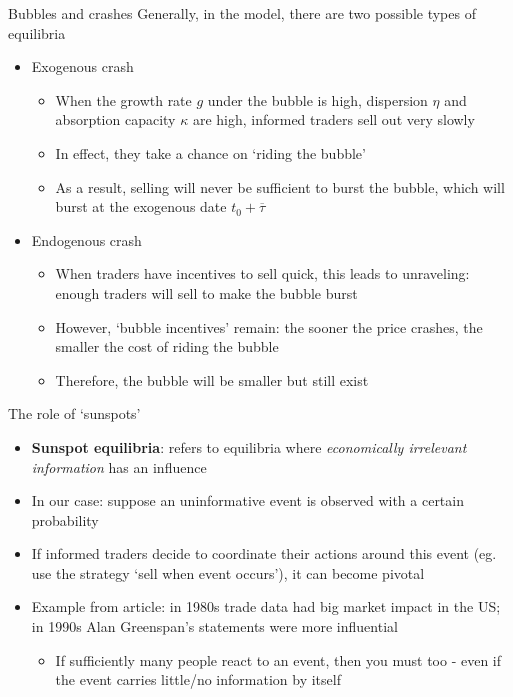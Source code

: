 \documentclass[english,10pt
,aspectratio=169
]{beamer}
\begin{document}
\begin{frame}{Bubbles and crashes}
	Generally, in the model, there are two possible types of equilibria
	\begin{itemize}
		\item Exogenous crash
		\begin{itemize}
			\item When the growth rate $g$ under the bubble is high, dispersion $\eta$ and absorption capacity $\kappa$ are high,  informed traders sell out very slowly
			\item In effect, they take a chance on `riding the bubble'
			\item As a result, selling will never be sufficient to burst the bubble, which will burst at the exogenous date $t_0+\overline{\tau}$
		\end{itemize}
		\item Endogenous crash
		\begin{itemize}
			\item When traders have incentives to sell quick, this leads to unraveling: enough traders will sell to make the bubble burst
			\item However, `bubble incentives' remain: the sooner the price crashes, the smaller the cost of riding the bubble
			\item Therefore, the bubble will be smaller but still exist
		\end{itemize}
	\end{itemize}
\end{frame}


\begin{frame}{The role of `sunspots'}
	\begin{itemize}
		\item \textbf{Sunspot equilibria}: refers to equilibria where \emph{economically irrelevant information} has an influence
		\item In our case: suppose an uninformative event is observed with a certain probability 
		\item If informed traders decide to coordinate their actions around this event (eg. use the strategy `sell when event occurs'), it can become pivotal
		\item Example from article: in 1980s trade data had big market impact in the US; in 1990s Alan Greenspan's statements were more influential
		\begin{itemize}
			\item If sufficiently many people react to an event, then you must too - even if the event carries little/no information by itself
		\end{itemize}
	\end{itemize}
\end{frame}
\end{document}
